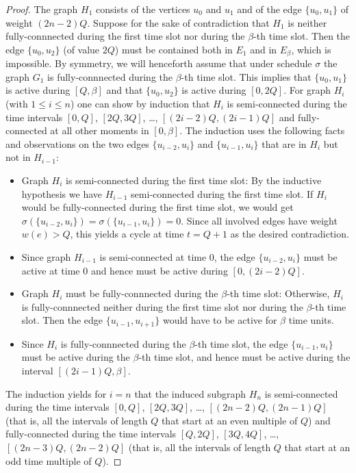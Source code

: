 \documentclass[runningheads]{llncs}
\newcommand{\set}[1]{\{ #1 \}}
\begin{document}
\begin{proof}
The graph $H_1$ consists of the vertices $u_0$ and $u_1$ and of the edge $\{u_0, u_1\}$ of weight $(2n-2)Q$.
Suppose for the sake of contradiction that $H_1$ is neither fully-connnected during the first time slot
nor during the $\beta$-th time slot.
Then the edge $\{u_0, u_2\}$ (of value $2Q$) must be contained both in $E_1$ and in $E_{\beta}$, which is impossible.
By symmetry, we will henceforth assume that under schedule $\sigma$ the graph $G_1$ is fully-connnected 
during the $\beta$-th time slot.
This implies that $\{u_0, u_1\}$ is active during $[Q,\beta]$ and that $\{u_0, u_2\}$ is active during $[0,2Q]$.
For graph $H_i$ (with $1\le i\le n$) one can show by induction that $H_i$ is semi-connected
during the time intervals $[0,Q]$, $[2Q,3Q]$, \dots, $[(2i-2)Q,(2i-1)Q]$ and fully-connected at all
other moments in $[0,\beta]$.
The induction uses the following facts and observations on the two edges $\set{u_{i-2}, u_i}$ 
and $\set{u_{i-1},u_i}$ that are in $H_i$ but not in $H_{i-1}$:
\begin{itemize}
\item Graph $H_i$ is semi-connected during the first time slot:
By the inductive hypothesis we have $H_{i-1}$ semi-connected during the first time slot.
If $H_i$ would be fully-connected during the first time slot, we would get
$\sigma(\{u_{i-2}, u_i\}) = \sigma(\{u_{i-1}, u_i\})=0$. 
Since all involved edges have weight $w(e)>Q$, this yields a cycle at time $t=Q+1$ as the desired contradiction.
\item Since graph $H_{i-1}$ is semi-connected at time $0$, the edge $\{u_{i-2},u_i\}$ must be active at 
time $0$ and hence must be active during $[0,(2i-2)Q]$.
\item Graph $H_i$ must be fully-connnected during the $\beta$-th time slot:
Otherwise, $H_i$ is fully-connnected neither during the first time slot nor during the $\beta$-th time slot. 
Then the edge $\{u_{i-1},u_{i+1}\}$ would have to be active for $\beta$ time units.
\item Since $H_i$ is fully-connnected during the $\beta$-th time slot, the edge $\{u_{i-1},u_i\}$ must be 
active during the $\beta$-th time slot, and hence must be active during the interval $[(2i-1)Q,\beta]$.
\end{itemize}
The induction yields for $i=n$ that the induced subgraph $H_n$ is semi-connected during the time intervals 
$[0,Q]$, $[2Q,3Q]$, \dots, $[(2n-2)Q,(2n-1)Q]$ (that is, all the intervals of length $Q$ that start at an even multiple of $Q$)
and fully-connected during the time intervals $[Q,2Q]$, $[3Q,4Q]$, \dots, $[(2n-3)Q,(2n-2)Q]$ (that is, all the 
intervals of length $Q$ that start at an odd time multiple of $Q$).


\end{proof}
\end{document}
